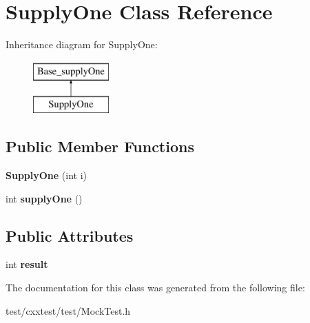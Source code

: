 \hypertarget{classSupplyOne}{\section{Supply\-One Class Reference}
\label{classSupplyOne}
}
Inheritance diagram for Supply\-One\-:\begin{figure}[H]
\begin{center}
\leavevmode
\includegraphics[height=2.000000cm]{classSupplyOne}
\end{center}
\end{figure}
\subsection*{Public Member Functions}
\begin{DoxyCompactItemize}
\item 
\hypertarget{classSupplyOne_a1bd86b1dafffe0a4d64b65d1782dd283}{{\bfseries Supply\-One} (int i)}\label{classSupplyOne_a1bd86b1dafffe0a4d64b65d1782dd283}

\item 
\hypertarget{classSupplyOne_ae3586846254a0ff8f52341bbb30aa23d}{int {\bfseries supply\-One} ()}\label{classSupplyOne_ae3586846254a0ff8f52341bbb30aa23d}

\end{DoxyCompactItemize}
\subsection*{Public Attributes}
\begin{DoxyCompactItemize}
\item 
\hypertarget{classSupplyOne_a3c5b51da95b185e17dad80607d982c23}{int {\bfseries result}}\label{classSupplyOne_a3c5b51da95b185e17dad80607d982c23}

\end{DoxyCompactItemize}


The documentation for this class was generated from the following file\-:\begin{DoxyCompactItemize}
\item 
test/cxxtest/test/Mock\-Test.\-h\end{DoxyCompactItemize}
